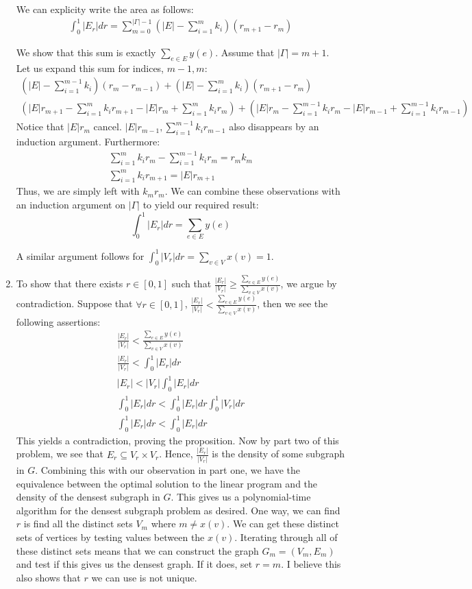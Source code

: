 \documentclass[12pt]{article}%
\begin{document}
\begin{enumerate}
   We can explicity write the area as follows:
   \begin{gather*}
     \int_0^1 |E_r| dr = \sum_{m=0}^{ |\Gamma|-1}(|E|-\sum_{i=1}^mk_i)(r_{m+1}-r_m)
   \end{gather*}

   We show  that this sum is exactly $\sum_{e \in E} y(e)$.
   Assume that $|\Gamma| = m+1$. Let us expand this sum for indices, $m-1,m$:
   \begin{gather*}
   (|E|-\sum_{i=1}^{m-1}k_i)(r_{m}-r_{m-1}) + (|E|-\sum_{i=1}^mk_i)(r_{m+1}-r_m) \\
   (|E|r_{m+1} - \sum_{i=1}^m k_ir_{m+1} - |E|r_m + \sum_{i=1}^mk_ir_m) +  (|E|r_{m} - \sum_{i=1}^{m-1} k_ir_{m} - |E|r_{m-1} + \sum_{i=1}^{m-1}k_ir_{m-1})
 \end{gather*}
Notice that $|E|r_m$ cancel. $|E|r_{m-1},\sum_{i=1}^{m-1}k_ir_{m-1}$ also disappears by an induction argument. Furthermore:
\begin{gather*}
\sum_{i=1}^mk_ir_m - \sum_{i=1}^{m-1} k_ir_{m} = r_mk_m \\
\sum_{i=1}^m k_ir_{m+1} = |E|r_{m+1}
\end{gather*}
Thus, we are simply left with $k_mr_m$. We can combine these observations with an induction argument on $|\Gamma|$ to yield our required result:
$$\int_0^1 |E_r| dr=  \sum_{e \in E} y(e) $$

   A similar argument follows for $\int_{0}^1 |V_r| dr = \sum_{v \in V} x(v) = 1$.
   \item To show that there exists $r \in [0,1]$ such that $\frac{|E_r|}{|V_r|} \geq \frac{\sum_{e \in E} y(e)}{\sum_{v \in V} x(v)}$, we argue by contradiction. Suppose that $\forall r \in [0,1]$, $\frac{|E_r|}{|V_r|} < \frac{\sum_{e \in E} y(e)}{\sum_{v \in V} x(v)}$, then we see the following assertions:
   \begin{gather*}
     \frac{|E_r|}{|V_r|} < \frac{\sum_{e \in E} y(e)}{\sum_{v \in V} x(v)} \\
     \frac{|E_r|}{|V_r|} < \int_0^1 |E_r| dr \\
     |E_r| < |V_r|\int_0^1 |E_r| dr \\
     \int_0^1 |E_r| dr < \int_0^1 |E_r| dr \int_0^1 |V_r| dr \\
     \int_0^1 |E_r| dr < \int_0^1 |E_r| dr
   \end{gather*}
   This yields a contradiction, proving the proposition. Now by part two of this problem, we see that $E_r \subseteq V_r \times V_r $. Hence,
   $\frac{|E_r|}{|V_r|}$ is the density of some subgraph in $G$. Combining this with our observation in part one, we have the equivalence between the optimal solution to the linear program and the density of the densest subgraph in $G$. This gives us a polynomial-time algorithm for the densest subgraph problem as desired. One way, we can find $r$ is find all the distinct sets $V_m$ where $m \neq x(v)$. We can get these distinct sets of vertices by testing values between the $x(v)$. Iterating through all of these distinct sets means that we can construct the graph $G_m = (V_m,E_m)$ and test if this gives us the densest graph. If it does, set $r = m$. I believe this also shows that $r$ we can use is not unique.
\end{enumerate}
\end{document}
